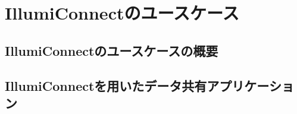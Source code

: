 \chapter{IllumiConnectのユースケース}
\section{IllumiConnectのユースケースの概要}
\section{IllumiConnectを用いたデータ共有アプリケーション}
